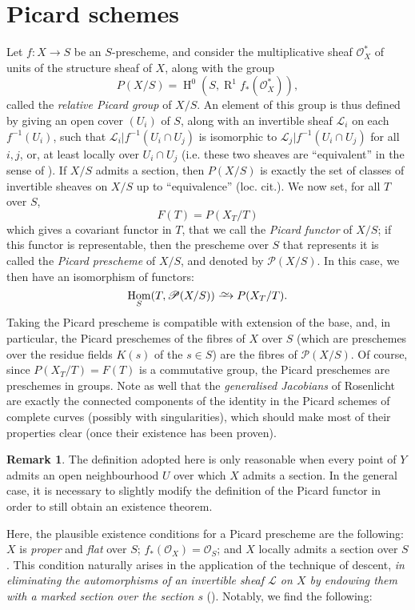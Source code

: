 \documentclass{article}
\theoremstyle{plain}
\theoremstyle{definition}
\newtheorem*{remark*}{Remark}
\newcommand{\sh}[1]{{\mathscr{#1}}}
\newcommand{\simto}{\xrightarrow{\raisebox{-0.7ex}[0ex][0ex]{$\sim$}}}
\DeclareMathOperator{\Hom}{Hom}
\DeclareMathOperator{\HH}{H}
\DeclareMathOperator{\RR}{R}
\newcommand{\oldpage}[1]{\marginpar{\footnotesize$\Big\vert$ \textit{p.~#1}}}
\begin{document}
\section{Picard schemes}
\label{B.3}

Let $f\colon X\to S$ be an $S$-prescheme, and consider the multiplicative sheaf $\sh{O}_X^*$ of units of the structure sheaf of $X$, along with the group
\[
  P(X/S) = \HH^0(S,\RR^1f_*(\sh{O}_X^*)),
\]
called the \emph{relative Picard group} of $X/S$.
An element of this group is thus defined by giving an open cover $(U_i)$ of $S$, along with an invertible sheaf $\sh{L}_i$ on each $f^{-1}(U_i)$, such that $\sh{L}_i|f^{-1}(U_i\cap U_j)$ is isomorphic to $\sh{L}_j|f^{-1}(U_i\cap U_j)$ for all $i,j$, or, at least locally over $U_i\cap U_j$ (i.e. these two sheaves are ``equivalent'' in the sense of \cite[B.4]{3}).
If $X/S$ admits a section, then $P(X/S)$ is exactly the set of classes of invertible sheaves on $X/S$ up to ``equivalence'' (loc. cit.).
We now set, for all $T$ over $S$,
\[
  F(T) = P(X_T/T)
\]
which gives a covariant functor in $T$, that we call the \emph{Picard functor} of $X/S$;
if this functor is representable, then the prescheme over $S$ that represents it is called the \emph{Picard prescheme} of $X/S$, and denoted by $\sh{P}(X/S)$.
In this case, we then have an isomorphism of functors:
\[
  \Hom_S(T,\sh{P}(X/S)) \simto P(X_T/T).
\]
Taking the Picard prescheme is compatible with extension of the base, and, in particular, the Picard preschemes of the fibres of $X$ over $S$ (which are preschemes over the residue fields $K(s)$ of the $s\in S$) are the fibres
\oldpage{195-16}
of $\sh{P}(X/S)$.
Of course, since $P(X_T/T)=F(T)$ is a commutative group, the Picard preschemes are preschemes in groups.
Note as well that the \emph{generalised Jacobians} of Rosenlicht are exactly the connected components of the identity in the Picard schemes of complete curves (possibly with singularities), which should make most of their properties clear (once their existence has been proven).

\begin{remark*}
  The definition adopted here is only reasonable when every point of $Y$ admits an open neighbourhood $U$ over which $X$ admits a section.
  In the general case, it is necessary to slightly modify the definition of the Picard functor in order to still obtain an existence theorem.

  Here, the plausible existence conditions for a Picard prescheme are the following: $X$ is \emph{proper} and \emph{flat} over $S$; $f_*(\sh{O}_X)=\sh{O}_S$; and $X$ locally admits a section over $S$.
  This condition naturally arises in the application of the technique of descent, \emph{in eliminating the automorphisms of an invertible sheaf $\sh{L}$ on $X$ by endowing them with a marked section over the section $s$} (\cite[B.4]{3}).
  Notably, we find the following:
\end{remark*}
\end{document}
